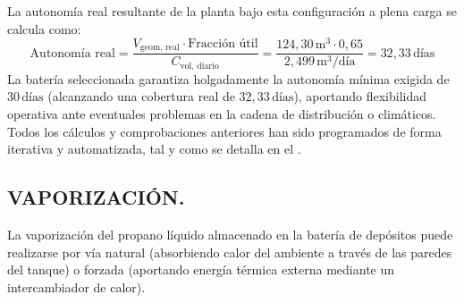\documentclass[12pt]{article}
\begin{document}
        La autonomía real resultante de la planta bajo esta configuración a plena carga se calcula como:
        \begin{equation}
            \text{Autonomía real} = \frac{V_{\text{geom, real}} \cdot \text{Fracción útil}}{C_{\text{vol, diario}}} = \frac{124,30\,\text{m}^3 \cdot 0,65}{2,499\,\text{m}^3/\text{día}} = 32,33\,\text{días}
        \end{equation}
        La batería seleccionada garantiza holgadamente la autonomía mínima exigida de $30\,\text{días}$ (alcanzando una cobertura real de $32,33\,\text{días}$), aportando flexibilidad operativa ante eventuales problemas en la cadena de distribución o climáticos. Todos los cálculos y comprobaciones anteriores han sido programados de forma iterativa y automatizada, tal y como se detalla en el .

        \subsection{VAPORIZACIÓN.}
        \label{sub:vaporizacion}
        La vaporización del propano líquido almacenado en la batería de depósitos puede realizarse por vía natural (absorbiendo calor del ambiente a través de las paredes del tanque) o forzada (aportando energía térmica externa mediante un intercambiador de calor). 
\end{document}
